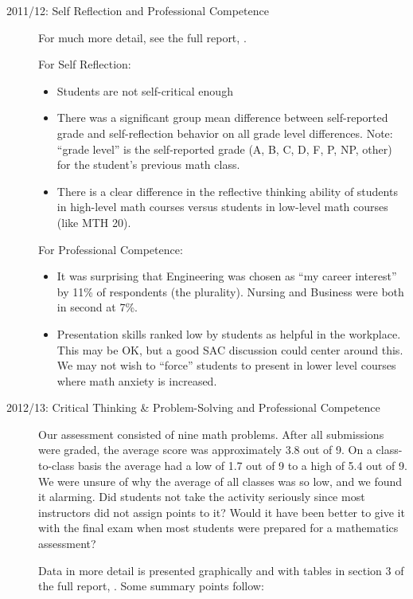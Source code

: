 \begin{description}

\item[2011/12: Self Reflection and Professional Competence]
  For much more detail, see the full report, \cite{annualLASreport2011} .

For Self Reflection: 
\begin{itemize}
\item Students are not self-critical enough
\item There was a significant group mean difference between self-reported grade
  and self-reflection behavior on all grade level differences.  Note: ``grade
  level'' is the self-reported grade (A, B, C, D, F, P, NP, other) for the
  student's previous math class.
\item There is a clear difference in the reflective thinking ability of students
  in high-level math courses versus students in low-level math courses (like MTH
  20).
\end{itemize}
For Professional Competence:
\begin{itemize}
\item It was surprising that Engineering was chosen as ``my career interest'' by
  11\% of respondents (the plurality). Nursing and Business were both in second
  at 7\%.\
\item Presentation skills ranked low by students as helpful in the workplace.
  This may be OK, but a good SAC discussion could center around this. We may not
  wish to ``force'' students to present in lower level courses where math
  anxiety is increased.
\end{itemize}

\item[2012/13:  Critical Thinking \& Problem-Solving and Professional Competence]

Our assessment consisted of nine math problems.  After all submissions were
graded, the average score was approximately 3.8 out of 9.  On a class-to-class
basis the average had a low of 1.7 out of 9 to a high of 5.4 out of 9.  We were
unsure of why the average of all classes was so low, and we found it alarming.
Did students not take the activity seriously since most instructors did not
assign points to it?  Would it have been better to give it with the final exam
when most students were prepared for a mathematics assessment? 

Data in more detail is presented graphically and with tables in section 3 of the
full report, \cite{annualLASreport2012}. Some summary points follow:


\end{description}
